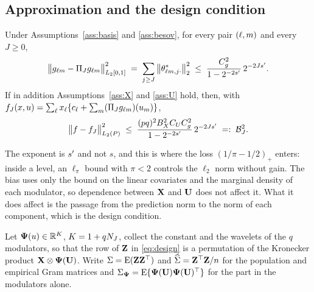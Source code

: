 \subsection{Approximation and the design condition}
\label{sec:approx}

\begin{lemma}
\label{lem:bias}
Under Assumptions~\ref{ass:basis} and \ref{ass:besov}, for every pair
$(\ell,m)$ and every $J \ge 0$,
\[
  \bigl\lVert g_{\ell m} - \Pi_{J}g_{\ell m}
  \bigr\rVert_{L_2[0,1]}^{2}
  \;=\; \sum_{j \ge J}\left\lVert \theta^{*}_{\ell m,j\cdot} \right\rVert_{2}^{2}
  \;\le\; \frac{C_g^{2}}{1-2^{-2s'}}\,2^{-2Js'} .
\]
If in addition Assumptions~\ref{ass:X} and \ref{ass:U} hold, then, with
$f_J(x,u) = \sum_{\ell}x_{\ell}\{c_{\ell} +
\sum_{m}(\Pi_{J}g_{\ell m})(u_{m})\}$,
\begin{equation}
  \label{eq:bias}
  \bigl\lVert f - f_J\bigr\rVert_{L_2(P)}^{2} \;\le\;
  \frac{(pq)^{2}B_X^{2}C_UC_g^{2}}{1-2^{-2s'}}\,2^{-2Js'}
  \;=:\; \mathcal{B}_{J}^{2} .
\end{equation}
\end{lemma}

The exponent is $s'$ and not $s$, and this is where the loss
$(1/\pi-1/2)_{+}$ enters: inside a level, an $\ell_\pi$ bound with $\pi < 2$
controls the $\ell_2$ norm without gain. The bias uses only the bound on the
linear covariates and the marginal density of each modulator, so dependence
between $\mathbf{X}$ and $\mathbf{U}$ does not affect it. What it does affect is the passage
from the prediction norm to the norm of each component, which is the design
condition.

Let $\boldsymbol{\Psi}(u) \in \mathbb{R}^{K}$, $K = 1 + qN_{J}$, collect the constant and the
wavelets of the $q$ modulators, so that the row of $\mathbf{Z}$ in
\eqref{eq:design} is a permutation of the Kronecker product
$\mathbf{X} \otimes \boldsymbol{\Psi}(\mathbf{U})$. Write $\Sigma = \mathrm{E}(\mathbf{Z}\mathbf{Z}^{\top})$ and
$\widehat{\Sigma} = \mathbf{Z}^{\top}\mathbf{Z}/n$ for the population and empirical Gram matrices and
$\Sigma_{\boldsymbol{\Psi}} = \mathrm{E}\{\boldsymbol{\Psi}(\mathbf{U})\boldsymbol{\Psi}(\mathbf{U})^{\top}\}$ for the part in the modulators
alone.

